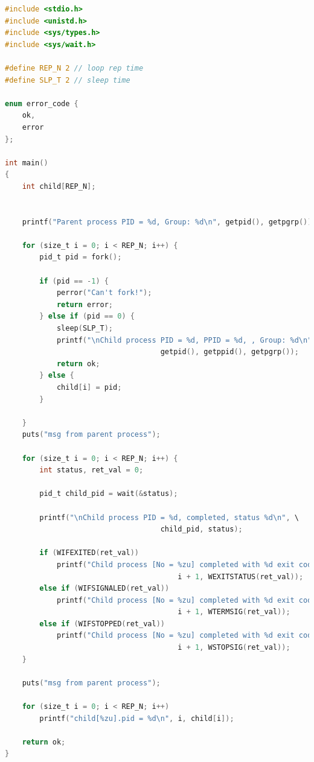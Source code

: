 \documentclass[12pt]{report}
\begin{document}
\begin{lstlisting}[label=some-code,caption=Вызов функции wait(),language=C]
#include <stdio.h>
#include <unistd.h>
#include <sys/types.h>
#include <sys/wait.h>

#define REP_N 2 // loop rep time
#define SLP_T 2 // sleep time

enum error_code {
    ok,
    error
};

int main()
{
    int child[REP_N];
    

    printf("Parent process PID = %d, Group: %d\n", getpid(), getpgrp());

    for (size_t i = 0; i < REP_N; i++) {
        pid_t pid = fork();

        if (pid == -1) {
            perror("Can't fork!");
            return error;
        } else if (pid == 0) {
            sleep(SLP_T);
            printf("\nChild process PID = %d, PPID = %d, , Group: %d\n", \
                                    getpid(), getppid(), getpgrp());
            return ok;
        } else {
            child[i] = pid;
        }

    }
    puts("msg from parent process");
    
    for (size_t i = 0; i < REP_N; i++) {
        int status, ret_val = 0;
        
        pid_t child_pid = wait(&status);

        printf("\nChild process PID = %d, completed, status %d\n", \
                                    child_pid, status);
        
        if (WIFEXITED(ret_val))
            printf("Child process [No = %zu] completed with %d exit code\n", 
                                        i + 1, WEXITSTATUS(ret_val));
        else if (WIFSIGNALED(ret_val))
            printf("Child process [No = %zu] completed with %d exit code\n", 
                                        i + 1, WTERMSIG(ret_val));
        else if (WIFSTOPPED(ret_val))
            printf("Child process [No = %zu] completed with %d exit code\n", 
                                        i + 1, WSTOPSIG(ret_val));
    }
    
    puts("msg from parent process");
    
    for (size_t i = 0; i < REP_N; i++)
        printf("child[%zu].pid = %d\n", i, child[i]);

    return ok;
}
\end{lstlisting}
\end{document}
